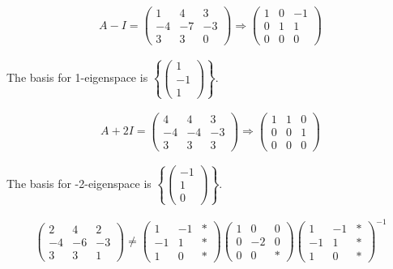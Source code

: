 \begin{align}
    A - I = \begin{pmatrix}
        1 & 4 & 3 \\ -4 & -7 & -3 \\ 3 & 3 & 0
    \end{pmatrix} \Rightarrow \begin{pmatrix}
        1 & 0 & -1 \\
        0 & 1 & 1 \\
        0 & 0 & 0
    \end{pmatrix}
\end{align}

\noindent
The basis for 1-eigenspace is \(\left\{ \begin{pmatrix}
    1 \\ -1 \\ 1
\end{pmatrix} \right\}\). 

\begin{align}
    A + 2I = \begin{pmatrix}
        4 & 4 & 3 \\
        -4 & -4 & -3 \\
        3 & 3 & 3
    \end{pmatrix} \Rightarrow \begin{pmatrix}
        1 & 1 & 0 \\
        0 & 0 & 1 \\
        0 & 0 & 0
    \end{pmatrix}
\end{align}

\noindent
The basis for -2-eigenspace is \(\left\{ \begin{pmatrix}
    -1 \\ 1 \\ 0
\end{pmatrix} \right\}\).

\begin{align}
    \begin{pmatrix}
        2 & 4 & 2 \\ -4 & -6 & -3 \\ 3 & 3 & 1
    \end{pmatrix} \ne \begin{pmatrix}
        1 & -1 & * \\
        -1 & 1 & * \\
        1 & 0 & *
    \end{pmatrix} \begin{pmatrix}
        1 & 0 & 0 \\
        0 & -2 & 0 \\
        0 & 0 & *
    \end{pmatrix}
    \begin{pmatrix}
        1 & -1 & * \\
        -1 & 1 & * \\
        1 & 0 & *
    \end{pmatrix}^{-1}
\end{align}

